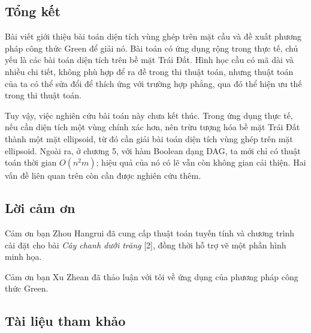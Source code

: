 \documentclass[11pt]{article}
\begin{document}
\subsection{Tổng kết}

Bài viết giới thiệu bài toán diện tích vùng ghép trên mặt cầu và đề xuất
phương pháp công thức Green để giải nó. Bài toán có ứng dụng rộng trong thực
tế, chủ yếu là các bài toán diện tích trên bề mặt Trái Đất. Hình học cầu có mã
dài và nhiều chi tiết, không phù hợp để ra đề trong thi thuật toán, nhưng thuật
toán của ta có thể sửa đổi để thích ứng với trường hợp phẳng, qua đó thể hiện
ưu thế trong thi thuật toán.

Tuy vậy, việc nghiên cứu bài toán này chưa kết thúc. Trong ứng dụng thực tế,
nếu cần diện tích một vùng chính xác hơn, nên trừu tượng hóa bề mặt Trái Đất
thành một mặt ellipsoid, từ đó cần giải bài toán diện tích vùng ghép trên mặt
ellipsoid. Ngoài ra, ở chương 5, với hàm Boolean dạng DAG, ta mới chỉ có thuật
toán thời gian \(O(n^2m)\); hiệu quả của nó có lẽ vẫn còn không gian cải thiện.
Hai vấn đề liên quan trên còn cần được nghiên cứu thêm.

\subsection*{Lời cảm ơn}

Cảm ơn bạn Zhou Hangrui đã cung cấp thuật toán tuyến tính và chương trình cài
đặt cho bài \emph{Cây chanh dưới trăng} [2], đồng thời hỗ trợ vẽ một phần hình
minh họa.

Cảm ơn bạn Xu Zhean đã thảo luận với tôi về ứng dụng của phương pháp công thức
Green.

\subsection*{Tài liệu tham khảo}
\end{document}
